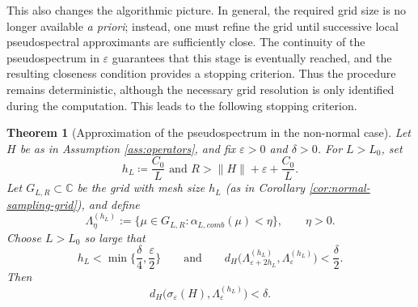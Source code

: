\documentclass[11pt]{article}
\newtheorem{theorem}{Theorem}
\theoremstyle{definition}
\newcommand{\C}{\mathbb{C}}
\begin{document}
This also changes the algorithmic picture. In general, the required grid size is no longer available \emph{a priori}; instead, one must refine the grid until successive local pseudospectral approximants are sufficiently close. The continuity of the pseudospectrum in $\varepsilon$ guarantees that this stage is eventually reached, and the resulting closeness condition provides a stopping criterion. Thus the procedure remains deterministic, although the necessary grid resolution is only identified during the computation. This leads to the following stopping criterion.

\begin{theorem}[Approximation of the pseudospectrum in the non-normal case]
\label{thm:pseudospectrum-nonnormal}
Let $H$ be as in Assumption \ref{ass:operators}, and fix $\varepsilon>0$ and $\delta>0$. For $L>L_0$, set
\[
h_L\coloneqq \frac{C_0}{L} \text{ and } R > \|H\|+\varepsilon+\frac{C_0}{L}.
\]
Let $G_{L,R}\subset\C$ be the grid with mesh size $h_L$ (as in Corollary \ref{cor:normal-sampling-grid}), and define
\[
\Lambda_\eta^{(h_L)}:=\{\mu\in G_{L,R}:\alpha_{L,comb}(\mu) < \eta\},
\qquad \eta > 0.
\]
Choose $L>L_0$ so large that
\[
h_L<\min \{ \frac{\delta}{4}, \frac{\varepsilon}{2} \}
\qquad\text{and}\qquad
d_H\bigl(\Lambda_{\varepsilon+2h_L}^{(h_L)},\Lambda_\varepsilon^{(h_L)}\bigr)<\frac{\delta}{2}.
\]
Then
\[
d_H\bigl(\sigma_\varepsilon(H),\Lambda_\varepsilon^{(h_L)}\bigr)<\delta.
\]
\end{theorem}
\end{document}
